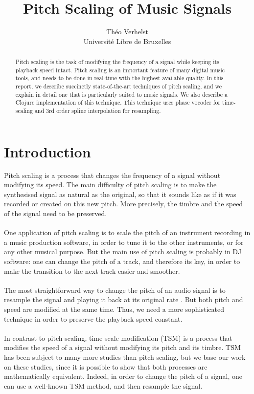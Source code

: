 \documentclass[letterpaper]{article}
\title{Pitch Scaling of Music Signals}
\author{Théo Verhelst \\
Université Libre de Bruxelles}
\begin{document}
\maketitle

\begin{abstract}
Pitch scaling is the task of modifying the frequency of a signal while keeping
its playback speed intact. Pitch scaling is an important feature of many digital
music tools, and needs to be done in real-time with the highest available
quality. In this report, we describe succinctly state-of-the-art techniques of
pitch scaling, and we explain in detail one that is particularly suited to music
signals. We also describe a Clojure implementation of this technique. This
technique uses phase vocoder for time-scaling and 3rd order spline interpolation
for resampling.
\end{abstract}

\section{Introduction}
Pitch scaling is a process that changes the frequency of a signal without
modifying its speed. The main difficulty of pitch scaling is to make the
synthesised signal as natural as the original, so that it sounds like as if it
was recorded or created on this new pitch. More precisely, the timbre and the
speed of the signal need to be preserved.
\paragraph{}
One application of pitch scaling is to scale the pitch of an instrument
recording in a music production software, in order to tune it to the other
instruments, or for any other musical purpose. But the main use of pitch scaling
is probably in DJ software: one can change the pitch of a track, and therefore
its key, in order to make the transition to the next track easier and smoother.
\paragraph{}
The most straightforward way to change the pitch of an audio signal is to
resample the signal and playing it back at its original rate \citep{DM}. But
both pitch and speed are modified at the same time. Thus, we need a more
sophisticated technique in order to preserve the playback speed constant.
\paragraph{}
In contrast to pitch scaling, time-scale modification (TSM) is a process that
modifies the speed of a signal without modifying its pitch and its timbre.
TSM has been subject to many more studies than pitch scaling, but we base our
work on these studies, since it is possible to show that both processes are
mathematically equivalent. Indeed, in order to change the pitch of a signal, one
can use a well-known TSM method, and then resample the signal.
\end{document}

